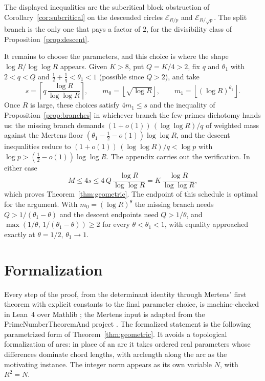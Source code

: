 \documentclass[11pt]{article}
\newcommand{\floor}[1]{\left\lfloor #1 \right\rfloor}
\newcommand{\ceil}[1]{\left\lceil #1 \right\rceil}
\newcommand{\E}{\mathcal E}
\begin{document}
The displayed inequalities are the subcritical block obstruction of Corollary~\ref{cor:subcritical} on the descended circles \(\E_{R/p}\) and \(\E_{R/\sqrt p}\).
The split branch is the only one that pays a factor of \(2\), for the divisibility class of Proposition~\ref{prop:descent}.

It remains to choose the parameters, and this choice is where the shape \(\log R/\log\log R\) appears.
Given \(K>8\), put \(Q=K/4>2\), fix \(q\) and \(\theta_1\) with \(2<q<Q\) and \(\tfrac12+\tfrac1q<\theta_1<1\) (possible since \(Q>2\)), and take
\[
  s=\ceil{q\,\frac{\log R}{\log\log R}},\qquad
  m_0=\floor{\sqrt{\log R}},\qquad
  m_1=\floor{(\log R)^{\theta_1}}.
\]
Once \(R\) is large, these choices satisfy \(4m_1\le s\) and the inequality of Proposition~\ref{prop:branches} in whichever branch the few-primes dichotomy hands us: the missing branch demands \((1+o(1))\,(\log\log R)/q\) of weighted mass against the Mertens floor \((\theta_1-\tfrac12-o(1))\log\log R\), and the descent inequalities reduce to \((1+o(1))\,(\log\log R)/q<\log p\) with \(\log p>(\tfrac12-o(1))\log\log R\).
The appendix carries out the verification.
In either case
\[
  M\le 4s\le 4\,Q\,\frac{\log R}{\log\log R}=K\,\frac{\log R}{\log\log R},
\]
which proves Theorem~\ref{thm:geometric}.
The endpoint of this schedule is optimal for the argument.
With \(m_0=(\log R)^{\theta}\) the missing branch needs \(Q>1/(\theta_1-\theta)\) and the descent endpoints need \(Q>1/\theta\), and \(\max(1/\theta,\,1/(\theta_1-\theta))\ge2\) for every \(\theta<\theta_1<1\), with equality approached exactly at \(\theta=1/2\), \(\theta_1\to1\).

\section{Formalization}
\label{sec:formalization}

Every step of the proof, from the determinant identity through Mertens' first theorem with explicit constants to the final parameter choice, is machine-checked in Lean~4 over Mathlib \cite{Mathlib2020,deMouraUllrich2021}; the Mertens input is adapted from the PrimeNumberTheoremAnd project \cite{PNTplus}.
The formalized statement is the following parametrized form of Theorem~\ref{thm:geometric}.
It avoids a topological formalization of arcs: in place of an arc it takes ordered real parameters whose differences dominate chord lengths, with arclength along the arc as the motivating instance.
The integer norm appears as its own variable \(N\), with \(R^2=N\).
\end{document}
